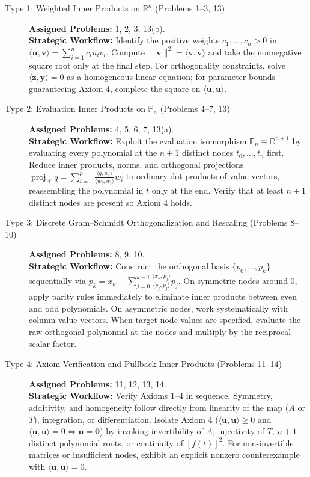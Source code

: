 \documentclass[11pt, letterpaper]{article}
\theoremstyle{definition}
\theoremstyle{remark}
\begin{document}
\begin{description}
    \item[{Type 1: Weighted Inner Products on $\mathbb{R}^n$ (Problems 1--3, 13)}]
    \textbf{Assigned Problems:} 1, 2, 3, 13(b).\\
    \textbf{Strategic Workflow:} Identify the positive weights $c_1, \dots, c_n > 0$ in $\langle \mathbf{u}, \mathbf{v} \rangle = \sum_{i=1}^n c_i u_i v_i$. Compute $\|\mathbf{v}\|^2 = \langle \mathbf{v}, \mathbf{v} \rangle$ and take the nonnegative square root only at the final step. For orthogonality constraints, solve $\langle \mathbf{z}, \mathbf{y} \rangle = 0$ as a homogeneous linear equation; for parameter bounds guaranteeing Axiom 4, complete the square on $\langle \mathbf{u}, \mathbf{u} \rangle$.

    \item[{Type 2: Evaluation Inner Products on $\mathbb{P}_n$ (Problems 4--7, 13)}]
    \textbf{Assigned Problems:} 4, 5, 6, 7, 13(a).\\
    \textbf{Strategic Workflow:} Exploit the evaluation isomorphism $\mathbb{P}_n \cong \mathbb{R}^{n+1}$ by evaluating every polynomial at the $n+1$ distinct nodes $t_0, \dots, t_n$ first. Reduce inner products, norms, and orthogonal projections $\operatorname{proj}_W q = \sum_{i=1}^p \frac{\langle q, w_i \rangle}{\langle w_i, w_i \rangle} w_i$ to ordinary dot products of value vectors, reassembling the polynomial in $t$ only at the end. Verify that at least $n+1$ distinct nodes are present so Axiom 4 holds.

    \item[{Type 3: Discrete Gram--Schmidt Orthogonalization and Rescaling (Problems 8--10)}]
    \textbf{Assigned Problems:} 8, 9, 10.\\
    \textbf{Strategic Workflow:} Construct the orthogonal basis $\{p_0, \dots, p_k\}$ sequentially via $p_k = x_k - \sum_{j=0}^{k-1} \frac{\langle x_k, p_j \rangle}{\langle p_j, p_j \rangle} p_j$. On symmetric nodes around $0$, apply parity rules immediately to eliminate inner products between even and odd polynomials. On asymmetric nodes, work systematically with column value vectors. When target node values are specified, evaluate the raw orthogonal polynomial at the nodes and multiply by the reciprocal scalar factor.

    \item[{Type 4: Axiom Verification and Pullback Inner Products (Problems 11--14)}]
    \textbf{Assigned Problems:} 11, 12, 13, 14.\\
    \textbf{Strategic Workflow:} Verify Axioms 1--4 in sequence. Symmetry, additivity, and homogeneity follow directly from linearity of the map ($A$ or $T$), integration, or differentiation. Isolate Axiom 4 ($\langle \mathbf{u}, \mathbf{u} \rangle \ge 0$ and $\langle \mathbf{u}, \mathbf{u} \rangle = 0 \iff \mathbf{u} = \mathbf{0}$) by invoking invertibility of $A$, injectivity of $T$, $n+1$ distinct polynomial roots, or continuity of $[f(t)]^2$. For non-invertible matrices or insufficient nodes, exhibit an explicit nonzero counterexample with $\langle \mathbf{u}, \mathbf{u} \rangle = 0$.


\end{description}
\end{document}
